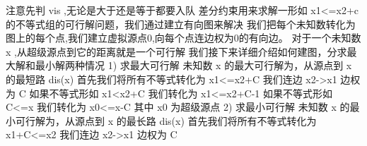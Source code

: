 {}注意先判\markdownRendererDollarSign{} vis \markdownRendererDollarSign{},无论是大于还是等于都要入队\markdownRendererInterblockSeparator
{}
\markdownRendererSectionEnd \markdownRendererSectionBegin
{}\markdownRendererInterblockSeparator
{}差分约束用来求解一形如\markdownRendererDollarSign{} x1<=x2+c \markdownRendererDollarSign{}的不等式组的可行解问题，我们通过建立有向图来解决\markdownRendererParagraphSeparator
{}我们把每个未知数转化为图上的每个点,我们建立虚拟源点0,向每个点连边权为0的有向边。\markdownRendererParagraphSeparator
{}对于一个未知数\markdownRendererDollarSign{} x \markdownRendererDollarSign{},从超级源点到它的距离就是一个可行解\markdownRendererParagraphSeparator
{}我们接下来详细介绍如何建图，分求最大解和最小解两种情况\markdownRendererParagraphSeparator
{}\markdownRendererDollarSign{} 1) \markdownRendererDollarSign{} 求最大可行解\markdownRendererParagraphSeparator
{}未知数\markdownRendererDollarSign{} x\markdownRendererParagraphSeparator
{} \markdownRendererDollarSign{}的最大可行解为，从源点到\markdownRendererDollarSign{} x \markdownRendererDollarSign{}的最短路\markdownRendererDollarSign{} dis(x) \markdownRendererDollarSign{}\markdownRendererParagraphSeparator
{}首先我们将所有不等式转化为\markdownRendererDollarSign{} x1<=x2+C \markdownRendererDollarSign{}我们连边\markdownRendererDollarSign{} x2->x1  \markdownRendererDollarSign{}边权为\markdownRendererDollarSign{} C \markdownRendererDollarSign{}\markdownRendererParagraphSeparator
{}如果不等式形如\markdownRendererDollarSign{} x1<x2+C \markdownRendererDollarSign{} 我们转化为\markdownRendererDollarSign{} x1<=x2+C-1 \markdownRendererDollarSign{}\markdownRendererParagraphSeparator
{}如果不等式形如\markdownRendererDollarSign{} C<=x \markdownRendererDollarSign{} 我们转化为\markdownRendererDollarSign{} x0<=x-C \markdownRendererDollarSign{} 其中\markdownRendererDollarSign{} x0 \markdownRendererDollarSign{}为超级源点\markdownRendererParagraphSeparator
{}\markdownRendererDollarSign{} 2) \markdownRendererDollarSign{}求最小可行解\markdownRendererParagraphSeparator
{}未知数\markdownRendererDollarSign{} x \markdownRendererDollarSign{}的最小可行解为，从源点到\markdownRendererDollarSign{} x \markdownRendererDollarSign{}的最长路\markdownRendererDollarSign{} dis(x) \markdownRendererDollarSign{}\markdownRendererParagraphSeparator
{}首先我们将所有不等式转化为\markdownRendererDollarSign{} x1+C<=x2 \markdownRendererDollarSign{} 我们连边\markdownRendererDollarSign{} x2->x1 \markdownRendererDollarSign{} 边权为\markdownRendererDollarSign{} C \markdownRendererDollarSign{}\markdownRendererParagraphSeparator
